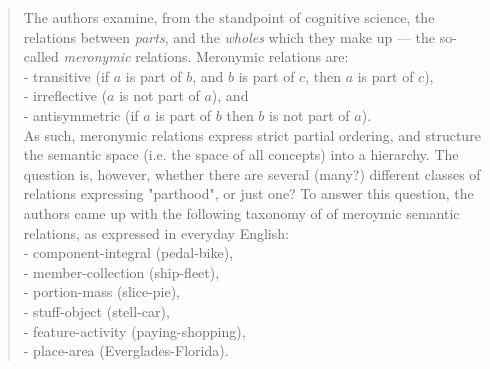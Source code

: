		\begin{quote}
		\small
		The authors examine, from the standpoint of cognitive science, 
		the relations between {\em parts}, and the {\em wholes} which they make up ---
		the so-called {\em meronymic} relations. Meronymic relations are:\\
		- transitive (if $a$ is part of $b$, and $b$ is part of $c$, then $a$ is part of $c$),\\
		- irreflective ($a$ is not part of $a$), and\\
		- antisymmetric (if $a$ is part of $b$ then $b$ is not part of $a$).\\
		As such, meronymic relations express strict partial ordering, and 
		structure the semantic space (i.e. the space of all concepts) into a hierarchy.
		The question is, however, whether there are several (many?) different classes of
		relations expressing "parthood", or just one? To answer this question, the authors
		came up with the following taxonomy of of meroymic semantic relations,
		as expressed in everyday English:\\
		- component-integral (pedal-bike),\\
		- member-collection (ship-fleet),\\
		- portion-mass (slice-pie),\\
		- stuff-object (stell-car),\\
		- feature-activity (paying-shopping),\\
		- place-area (Everglades-Florida).
		\end{quote}
		
